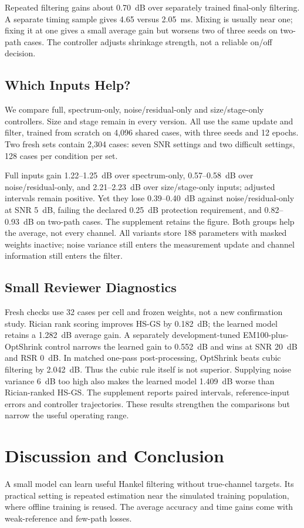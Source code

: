 \documentclass[journal]{IEEEtran}
\begin{document}
Repeated filtering gains about 0.70~dB over separately trained final-only
filtering. A separate timing sample gives 4.65 versus 2.05~ms. Mixing is
usually near one; fixing it at one gives a small average gain but worsens
two of three seeds on two-path cases. The controller adjusts shrinkage
strength, not a reliable on/off decision.

\subsection{Which Inputs Help?}
We compare full, spectrum-only, noise/residual-only and size/stage-only
controllers. Size and stage remain in every version. All use the same
update and filter, trained from scratch on 4,096 shared cases, with three
seeds and 12 epochs. Two fresh sets contain 2,304 cases: seven SNR
settings and two difficult settings, 128 cases per condition per set.

Full inputs gain 1.22--1.25~dB over spectrum-only, 0.57--0.58~dB over
noise/residual-only, and 2.21--2.23~dB over size/stage-only inputs;
adjusted intervals remain positive. Yet they lose 0.39--0.40~dB against
noise/residual-only at SNR 5~dB, failing the declared 0.25~dB protection
requirement, and 0.82--0.93~dB on two-path cases. The supplement retains
the figure. Both groups help the average, not every channel. All variants
store 188 parameters with masked weights inactive; noise variance still
enters the measurement update and channel information still enters the filter.

\subsection{Small Reviewer Diagnostics}
Fresh checks use 32 cases per cell and frozen weights, not a new
confirmation study. Rician rank scoring improves HS-GS by 0.182~dB;
the learned model retains a 1.282~dB average gain. A separately
development-tuned EM100-plus-OptShrink control narrows the learned gain
to 0.552~dB and wins at SNR 20~dB and RSR 0~dB. In matched one-pass
post-processing, OptShrink beats cubic filtering by 2.042~dB. Thus the
cubic rule itself is not superior. Supplying noise variance 6~dB too
high also makes the learned model 1.409~dB worse than Rician-ranked
HS-GS. The supplement reports paired intervals, reference-input errors
and controller trajectories. These results strengthen the comparisons
but narrow the useful operating range.

\section{Discussion and Conclusion}
A small model can learn useful Hankel filtering without true-channel
targets. Its practical setting is repeated estimation near the simulated
training population, where offline training is reused. The average
accuracy and time gains come with weak-reference and few-path losses.
\end{document}
